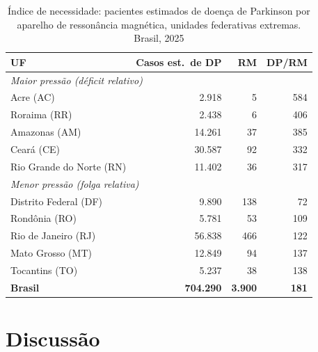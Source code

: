 \documentclass[12pt,a4paper,oneside]{article}
\begin{document}
\begin{table}[htbp]
\centering
\caption{Índice de necessidade: pacientes estimados de doença de
Parkinson por aparelho de ressonância magnética, unidades federativas
extremas. Brasil, 2025}
\begin{tabular}{lrrr}
\toprule
\textbf{UF} & \textbf{Casos est.\ de DP} & \textbf{RM} & \textbf{DP/RM} \\
\midrule
\multicolumn{4}{l}{\textit{Maior pressão (déficit relativo)}} \\
Acre (AC)                   &  2.918 &   5 & 584 \\
Roraima (RR)                &  2.438 &   6 & 406 \\
Amazonas (AM)               & 14.261 &  37 & 385 \\
Ceará (CE)                  & 30.587 &  92 & 332 \\
Rio Grande do Norte (RN)    & 11.402 &  36 & 317 \\
\midrule
\multicolumn{4}{l}{\textit{Menor pressão (folga relativa)}} \\
Distrito Federal (DF)       &  9.890 & 138 &  72 \\
Rondônia (RO)               &  5.781 &  53 & 109 \\
Rio de Janeiro (RJ)         & 56.838 & 466 & 122 \\
Mato Grosso (MT)            & 12.849 &  94 & 137 \\
Tocantins (TO)              &  5.237 &  38 & 138 \\
\midrule
\textbf{Brasil}       & \textbf{704.290} & \textbf{3.900} & \textbf{181} \\
\bottomrule
\end{tabular}
\par{}
\label{tab:necessidade}
\end{table}

\section{Discussão}
\end{document}

